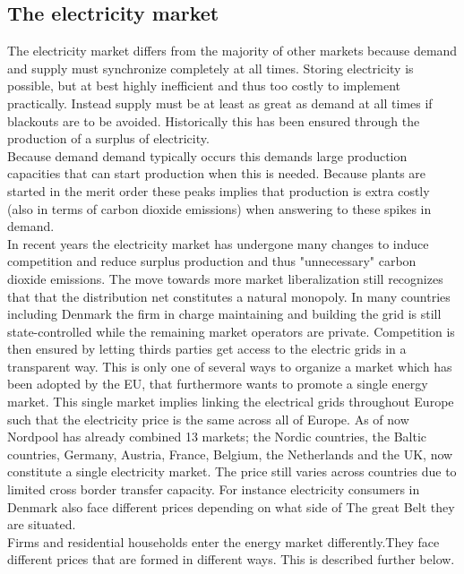 \label{sec:theory}

\subsection{The electricity market}
\label{subsec:t_market}
The electricity market differs from the majority of other markets because demand and supply must synchronize completely at all times. Storing electricity is possible, but at best highly inefficient and thus too costly to implement practically. Instead supply must be at least as great as demand at all times if blackouts are to be avoided. Historically this has been ensured through the production of a surplus of electricity. \medskip\\

Because demand demand typically occurs this demands large production capacities that can start production when this is needed. Because plants are started in the merit order these peaks implies that production is extra costly (also in terms of carbon dioxide emissions) when answering to these spikes in demand. 
\medskip\\

In recent years the electricity market has undergone many changes to induce competition and reduce surplus production and thus "unnecessary" carbon dioxide emissions. The move towards more market liberalization still recognizes that that the distribution net constitutes a natural monopoly. In many countries including Denmark the firm in charge maintaining and building the grid is still state-controlled while the remaining market operators are private. Competition is then ensured by letting thirds parties get access to the electric grids in a transparent way. This is only one of several ways to organize a market which has been adopted by the EU, that furthermore wants to promote a single energy market. This single market  implies linking the electrical grids throughout Europe such that the electricity price is the same across all of Europe. As of now Nordpool has already combined 13 markets; the Nordic countries, the Baltic countries, Germany, Austria, France, Belgium, the Netherlands and the UK, now constitute a single electricity market. The price still varies across countries due to limited cross border transfer capacity. For instance electricity consumers in Denmark also face different prices depending on what side of The great Belt they are situated. 
\cite{https://www.nordpoolgroup.com/the-power-market/Integrated-Europe/}\medskip \\
Firms and residential households enter the energy market differently.They face different prices that are formed in different ways. This is described further below. 

